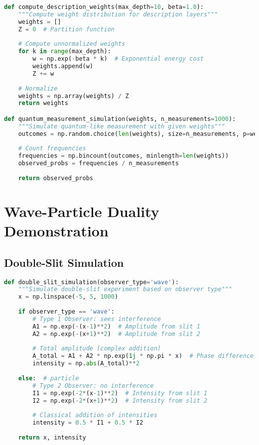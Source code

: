 \begin{lstlisting}[language=Python, caption=Quantum Weight Distribution]
def compute_description_weights(max_depth=10, beta=1.0):
    """Compute weight distribution for description layers"""
    weights = []
    Z = 0  # Partition function
    
    # Compute unnormalized weights
    for k in range(max_depth):
        w = np.exp(-beta * k)  # Exponential energy cost
        weights.append(w)
        Z += w
    
    # Normalize
    weights = np.array(weights) / Z
    return weights

def quantum_measurement_simulation(weights, n_measurements=1000):
    """Simulate quantum-like measurement with given weights"""
    outcomes = np.random.choice(len(weights), size=n_measurements, p=weights)
    
    # Count frequencies
    frequencies = np.bincount(outcomes, minlength=len(weights))
    observed_probs = frequencies / n_measurements
    
    return observed_probs
\end{lstlisting}

\section{Wave-Particle Duality Demonstration}

\subsection{Double-Slit Simulation}

\begin{lstlisting}[language=Python, caption=Wave-Particle Duality]
def double_slit_simulation(observer_type='wave'):
    """Simulate double-slit experiment based on observer type"""
    x = np.linspace(-5, 5, 1000)
    
    if observer_type == 'wave':
        # Type 1 Observer: sees interference
        A1 = np.exp(-(x-1)**2)  # Amplitude from slit 1
        A2 = np.exp(-(x+1)**2)  # Amplitude from slit 2
        
        # Total amplitude (complex addition)
        A_total = A1 + A2 * np.exp(1j * np.pi * x)  # Phase difference
        intensity = np.abs(A_total)**2
        
    else:  # particle
        # Type 2 Observer: no interference
        I1 = np.exp(-2*(x-1)**2)  # Intensity from slit 1
        I2 = np.exp(-2*(x+1)**2)  # Intensity from slit 2
        
        # Classical addition of intensities
        intensity = 0.5 * I1 + 0.5 * I2
    
    return x, intensity
\end{lstlisting}

